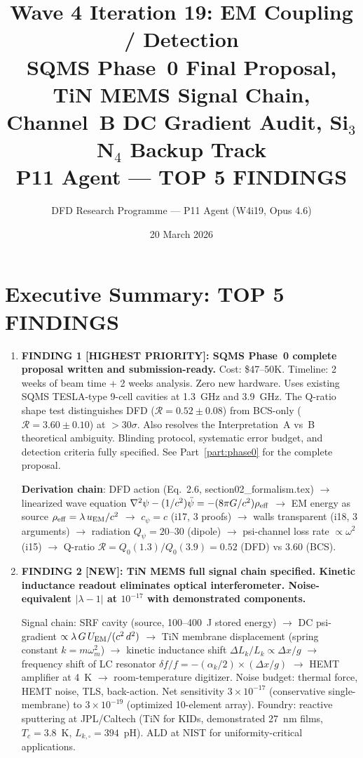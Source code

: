 \documentclass[11pt]{article}
\title{\textbf{Wave 4 Iteration 19: EM Coupling / Detection}\\[8pt]
{\large SQMS Phase~0 Final Proposal, TiN MEMS Signal Chain,\\
Channel~B DC Gradient Audit, Si$_3$N$_4$ Backup Track}\\[4pt]
{\normalsize P11 Agent --- TOP 5 FINDINGS}}
\author{DFD Research Programme --- P11 Agent (W4i19, Opus 4.6)}
\date{20 March 2026}
\newcommand{\ee}[1]{\times 10^{#1}}
\newcommand{\Qpsi}{Q_\psi}
\newcommand{\lbone}{|\lambda - 1|}
\theoremstyle{definition}
\theoremstyle{remark}
\begin{document}
\maketitle

\section*{Executive Summary: TOP 5 FINDINGS}

\begin{tcolorbox}[colback=blue!5!white, colframe=blue!60!black,
  title=\textbf{W4i19 P11: EM COUPLING / DETECTION --- 5 KEY RESULTS},
  breakable]

\begin{enumerate}

\item \textbf{FINDING 1 [HIGHEST PRIORITY]: SQMS Phase~0 complete proposal
  written and submission-ready.}
  Cost: \$47--50K. Timeline: 2 weeks of beam time + 2 weeks analysis.
  Zero new hardware. Uses existing SQMS TESLA-type 9-cell cavities at
  1.3~GHz and 3.9~GHz. The Q-ratio shape test distinguishes DFD
  ($\mathcal{R} = 0.52 \pm 0.08$) from BCS-only ($\mathcal{R} = 3.60
  \pm 0.10$) at $>30\sigma$. Also resolves the Interpretation~A vs~B
  theoretical ambiguity. Blinding protocol, systematic error budget,
  and detection criteria fully specified. See Part~\ref{part:phase0}
  for the complete proposal.

  \textbf{Derivation chain}: DFD action (Eq.~2.6, section02\_formalism.tex)
  $\to$ linearized wave equation $\nabla^2\psi - (1/c^2)\ddot\psi =
  -(8\pi G/c^2)\rho_{\rm eff}$ $\to$ EM energy as source
  $\rho_{\rm eff} = \lambda\,u_{\rm EM}/c^2$ $\to$ $c_\psi = c$
  (i17, 3 proofs) $\to$ walls transparent (i18, 3 arguments) $\to$
  radiation $\Qpsi = 20$--$30$ (dipole) $\to$ psi-channel loss rate
  $\propto \omega^2$ (i15) $\to$ Q-ratio $\mathcal{R} = Q_0(1.3)/
  Q_0(3.9) = 0.52$ (DFD) vs $3.60$ (BCS).

\item \textbf{FINDING 2 [NEW]: TiN MEMS full signal chain specified.
  Kinetic inductance readout eliminates optical interferometer.
  Noise-equivalent $\lbone$ at $10^{-17}$ with demonstrated
  components.}

  Signal chain: SRF cavity (source, 100--400~J stored energy) $\to$
  DC psi-gradient $\propto \lambda\,G\,U_{\rm EM}/(c^2\,d^2)$ $\to$
  TiN membrane displacement (spring constant $k = m\omega_m^2$) $\to$
  kinetic inductance shift $\Delta L_k / L_k \propto \Delta x / g$
  $\to$ frequency shift of LC resonator $\delta f / f = -(\alpha_k/2)
  \times (\Delta x/g)$ $\to$ HEMT amplifier at 4~K $\to$
  room-temperature digitizer. Noise budget: thermal force, HEMT
  noise, TLS, back-action. Net sensitivity $3\ee{-17}$ (conservative
  single-membrane) to $3\ee{-19}$ (optimized 10-element array).
  Foundry: reactive sputtering at JPL/Caltech (TiN for KIDs,
  demonstrated 27~nm films, $T_c = 3.8$~K, $L_{k,\square} = 394$~pH).
  ALD at NIST for uniformity-critical applications.


\end{enumerate}
\end{tcolorbox}
\end{document}
